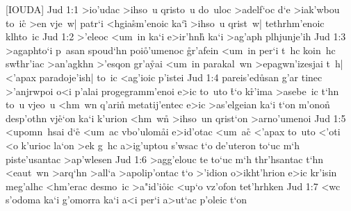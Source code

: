 [IOUDA]
\vs Jud 1:1
>io'udac
>ihso~u
qristo~u
do~uloc
>adelf`oc
d`e
>iak'wbou
to~i\r{c}
>en
vje~w|
patr`i
<hgia\r{s}m'enoic
ka`i\r{}
>ihso~u
qrist~w|
tethrhm'enoic
klhto~ic\bibvsend
\vs Jud 1:2
>'eleoc
<um~in
ka`i
e>ir'hn\r{h}
ka`i
>ag'aph
plhjunje'ih\bibvsend
\vs Jud 1:3
>agaphto`i
p~asan
spoud`hn
poi\r{o}'umenoc
\r{g}r'afein
<um~in
per`i
t~hc
koin~hc
sw\r{t}hr'iac
>an'agkhn
>'esqon
gr'a\r{y}ai
<um~in
parakal~wn
>epagwn'izesjai
t~h|
<'apax
paradoje'ish|
to~ic
<ag'ioic
p'istei\bibvsend
\vs Jud 1:4
pareis'ed\r{u}san
g'ar
tinec
>'anjrwpoi
o<i
p'alai
progegramm'enoi
e>ic
to~uto
\r{t}`o
k\r{r}'ima
>asebe~ic
t`hn
to~u
vjeo~u
<hm~wn
q'ari\r{n}
metatij'entec
e>ic
>as'elgeian
ka`i
t`on
m'ono\r{n}
desp'othn
vj\r{e}`on
ka`i
k'urion
<hm~wn\r{}
>ihso~un
qrist`on
>arno'umenoi\bibvsend
\vs Jud 1:5
<upomn~hsai
d`e\r{}
<um~ac
vbo'ulom\r{a}i
e>id'otac
<um~ac\r{}
<'apax
to~uto
<'oti
<o
k'urioc
la`on
>ek
g~hc
a>ig'uptou
s'wsac
t`o
de'uteron
to`uc
m`h
piste'usantac
>ap'wlesen\bibvsend
\vs Jud 1:6
>agg'elouc
te
to`uc
m`h
thr'hsantac
t`hn
<eaut~wn
>arq`hn
>all`a
>apolip'ontac
t`o
>'idion
o>ikht'hrion
e>ic
kr'isin
meg'alhc
<hm'erac
desmo~ic
>a"id'i\r{o}ic
<up`o
vz'ofon
tet'hrhken\bibvsend
\vs Jud 1:7
<wc
s'odoma
ka`i
g'omorra
ka`i
a<i
per`i
a>ut`ac
p'oleic
t`on
